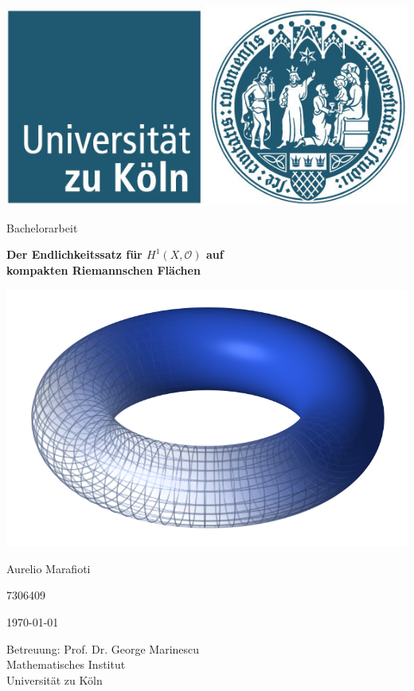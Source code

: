 \documentclass[10pt,a4paper]{article}
\begin{document}
	
\pagestyle{empty}
		\begin{center} 
			\includegraphics[scale=0.3]{./Dateien/UniKoelnLogo.jpeg}
			\vspace*{2cm} 
			
			
			\large 
			Bachelorarbeit
			\vspace*{1cm}
			
			{\huge \textbf{Der Endlichkeitssatz für $H^1(X,\mathcal{O})$ auf \\[0.5cm]kompakten Riemannschen Flächen}}
			\vspace*{1cm}
			
			\includegraphics[scale=0.2
			]{./Dateien/Torus.png}
			\vspace{1.5cm}
			
			Aurelio Marafioti
			
			7306409
			\vspace*{1cm}
			
			\today
			\vspace*{1.5cm}
			
			\small{
			Betreuung: Prof. Dr. George Marinescu \\
			Mathematisches Institut \\
			Universität zu Köln}
		\end{center}
\end{document}
